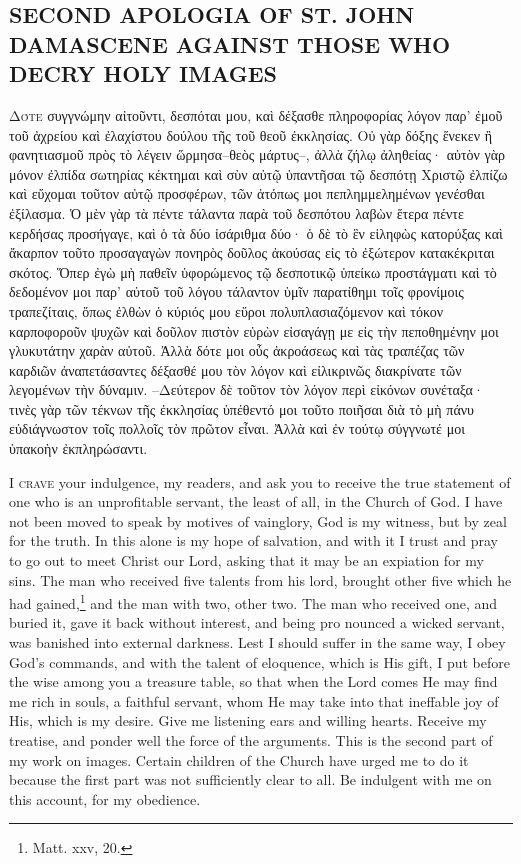 \documentclass[10pt]{book}
\newcommand{\switchGreek}[1][]{\selectlanguage{polutonikogreek} \switchcolumn*[#1]}
\newcommand{\switchEnglish}{\selectlanguage{english} \switchcolumn}
\begin{document}
\begin{paracol}{2}
\switchEnglish

\section*{SECOND APOLOGIA OF ST. JOHN DAMASCENE AGAINST THOSE WHO DECRY HOLY IMAGES}

\switchGreek

\lettrine{Δ}{ότε} συγγνώμην αἰτοῦντι,
δεσπόται μου, καὶ δέξασθε πληροφορίας λόγον παρ’ ἐμοῦ
τοῦ ἀχρείου καὶ ἐλαχίστου δούλου τῆς τοῦ θεοῦ ἐκκλησίας. Οὐ γὰρ δόξης ἕνεκεν ἢ
φανητιασμοῦ πρὸς τὸ λέγειν ὥρμησα–θεὸς μάρτυς–, ἀλλὰ ζήλῳ ἀληθείας· αὐτὸν γὰρ
μόνον ἐλπίδα σωτηρίας κέκτημαι καὶ σὺν αὐτῷ ὑπαντῆσαι τῷ δεσπότῃ Χριστῷ ἐλπίζω
καὶ εὔχομαι τοῦτον αὐτῷ προσφέρων, τῶν ἀτόπως μοι πεπλημμελημένων γενέσθαι
ἐξίλασμα. Ὁ μὲν γὰρ τὰ πέντε τάλαντα παρὰ τοῦ δεσπότου λαβὼν ἕτερα πέντε
κερδήσας προσήγαγε, καὶ ὁ τὰ δύο ἰσάριθμα δύο· ὁ δὲ τὸ ἓν εἰληφὼς κατορύξας
καὶ ἄκαρπον τοῦτο προσαγαγὼν πονηρὸς δοῦλος ἀκούσας εἰς τὸ ἐξώτερον
κατακέκριται σκότος. Ὅπερ ἐγὼ μὴ παθεῖν ὑφορώμενος τῷ δεσποτικῷ ὑπείκω
προστάγματι καὶ τὸ δεδομένον μοι παρ’ αὐτοῦ τοῦ λόγου τάλαντον ὑμῖν παρατίθημι
τοῖς φρονίμοις τραπεζίταις, ὅπως ἐλθὼν ὁ κύριός μου εὕροι πολυπλασιαζόμενον
καὶ τόκον καρποφοροῦν ψυχῶν καὶ δοῦλον πιστὸν εὑρὼν εἰσαγάγῃ με εἰς τὴν
πεποθημένην μοι γλυκυτάτην χαρὰν αὐτοῦ. Ἀλλὰ δότε μοι οὖς ἀκροάσεως καὶ τὰς
τραπέζας τῶν καρδιῶν ἀναπετάσαντες δέξασθέ μου τὸν λόγον καὶ εἰλικρινῶς
διακρίνατε τῶν λεγομένων τὴν δύναμιν. –Δεύτερον δὲ τοῦτον τὸν λόγον περὶ
εἰκόνων συνέταξα· τινὲς γὰρ τῶν τέκνων τῆς ἐκκλησίας ὑπέθεντό μοι τοῦτο
ποιῆσαι διὰ τὸ μὴ πάνυ εὐδιάγνωστον τοῖς πολλοῖς τὸν πρῶτον εἶναι. Ἀλλὰ καὶ ἐν
τούτῳ σύγγνωτέ μοι ὑπακοὴν ἐκπληρώσαντι.

\switchEnglish

\lettrine{I}{ crave} your indulgence, my readers,
and ask you to receive the true statement 
of one who is an unprofitable servant, the least 
of all, in the Church of God. I have not been 
moved to speak by motives of vainglory, God 
is my witness, but by zeal for the truth. In 
this alone is my hope of salvation, and with it 
I trust and pray to go out to meet Christ our 
Lord, asking that it may be an expiation for 
my sins. The man who received five talents 
from his lord, brought other five which he had 
gained,\footnote{Matt. xxv, 20.} and the man with two, other two. 
The man who received one, and buried it, 
gave it back without interest, and being pro 
nounced a wicked servant, was banished into 
external darkness. Lest I should suffer in the 
same way, I obey God's commands, and with 
the talent of eloquence, which is His gift, I put 
before the wise among you a treasure table, so 
that when the Lord comes He may find me 
rich in souls, a faithful servant, whom He may 
take into that ineffable joy of His, which is my 
desire. Give me listening ears and willing
hearts. Receive my treatise, and ponder well 
the force of the arguments. This is the second 
part of my work on images. Certain children 
of the Church have urged me to do it because 
the first part was not sufficiently clear to all. 
Be indulgent with me on this account, for my 
obedience. 


\end{paracol}
\end{document}
